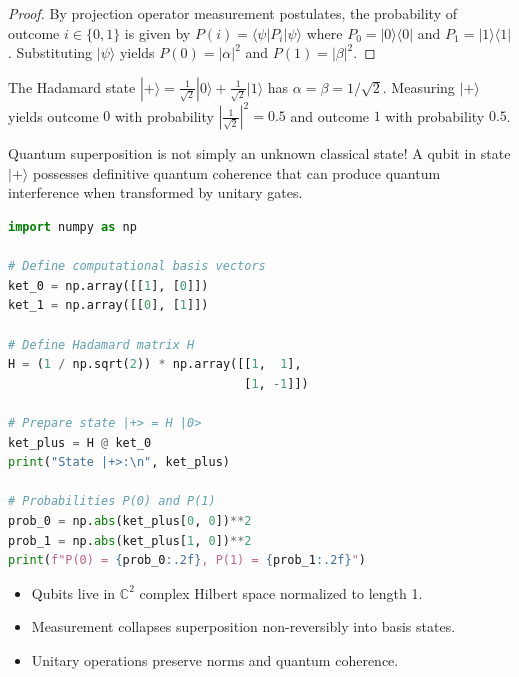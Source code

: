 \documentclass[mode=notes, palette=midnight, fontsize=11pt]{modernclassnotes}
\begin{document}
\begin{proof}
By projection operator measurement postulates, the probability of outcome $i \in \{0, 1\}$ is given by $P(i) = \langle \psi | P_i | \psi \rangle$ where $P_0 = |0\rangle\langle 0|$ and $P_1 = |1\rangle\langle 1|$. Substituting $|\psi\rangle$ yields $P(0) = |\alpha|^2$ and $P(1) = |\beta|^2$.
\end{proof}

\begin{example}
The Hadamard state $|+\rangle = \frac{1}{\sqrt{2}}|0\rangle + \frac{1}{\sqrt{2}}|1\rangle$ has $\alpha = \beta = 1/\sqrt{2}$.
Measuring $|+\rangle$ yields outcome $0$ with probability $|\frac{1}{\sqrt{2}}|^2 = 0.5$ and outcome $1$ with probability $0.5$.
\end{example}

\begin{warning}
Quantum superposition is not simply an unknown classical state! A qubit in state $|+\rangle$ possesses definitive quantum coherence that can produce quantum interference when transformed by unitary gates.
\end{warning}

\begin{codebox}
\begin{lstlisting}[language=Python]
import numpy as np

# Define computational basis vectors
ket_0 = np.array([[1], [0]])
ket_1 = np.array([[0], [1]])

# Define Hadamard matrix H
H = (1 / np.sqrt(2)) * np.array([[1,  1],
                                 [1, -1]])

# Prepare state |+> = H |0>
ket_plus = H @ ket_0
print("State |+>:\n", ket_plus)

# Probabilities P(0) and P(1)
prob_0 = np.abs(ket_plus[0, 0])**2
prob_1 = np.abs(ket_plus[1, 0])**2
print(f"P(0) = {prob_0:.2f}, P(1) = {prob_1:.2f}")
\end{lstlisting}
\end{codebox}

\begin{takeaways}
\begin{itemize}
    \item Qubits live in $\mathbb{C}^2$ complex Hilbert space normalized to length 1.
    \item Measurement collapses superposition non-reversibly into basis states.
    \item Unitary operations preserve norms and quantum coherence.
\end{itemize}
\end{takeaways}
\end{document}
